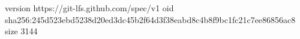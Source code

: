 version https://git-lfs.github.com/spec/v1
oid sha256:245d523ebd5238d20ed3dc45b2f64d3f38eabd8c4b8f9bc1fc21c7ee86856ac8
size 3144
